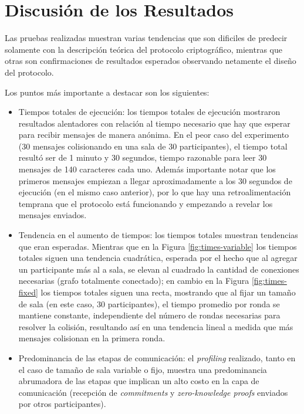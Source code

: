\section{Discusión de los Resultados}

Las pruebas realizadas muestran varias tendencias que son dificiles de 
predecir solamente con la descripción teórica del protocolo criptográfico, 
mientras que otras son confirmaciones de resultados esperados observando 
netamente el diseño del protocolo.

Los puntos más importante a destacar son los siguientes:

\begin{itemize}
	\item Tiempos totales de ejecución: los tiempos totales de ejecución 
	mostraron resultados alentadores con relación al tiempo necesario que hay 
	que esperar para recibir mensajes de manera anónima. En el peor caso del 
	experimento (30 mensajes colisionando en una sala de 30 participantes), el 
	tiempo total resultó ser de 1 minuto y 30 segundos, tiempo razonable para 
	leer 30 mensajes de 140 caracteres cada uno. Además importante notar que 
	los primeros mensajes empiezan a llegar aproximadamente a los 30 segundos 
	de ejecución (en el mismo caso anterior), por lo que hay una 
	retroalimentación temprana que el protocolo está funcionando y empezando a 
	revelar los mensajes enviados.
	\item Tendencia en el aumento de tiempos: los tiempos totales muestran 
	tendencias que eran esperadas. Mientras que en la Figura 
	\ref{fig:times-variable} los tiempos totales siguen una tendencia 
	cuadrática, esperada por el hecho que al agregar un participante más al a 
	sala, se elevan al cuadrado la cantidad de conexiones necesarias (grafo 
	totalmente conectado); en cambio en la Figura \ref{fig:times-fixed} 
	los tiempos totales siguen una recta, mostrando que al fijar un tamaño de 
	sala (en este caso, 30 participantes), el tiempo promedio por ronda se 
	mantiene constante, independiente del número de rondas necesarias para 
	resolver la colisión, resultando así en una tendencia lineal a medida que 
	más mensajes colisionan en la primera ronda.
	\item Predominancia de las etapas de comunicación: el \emph{profiling} 
	realizado, tanto en el caso de tamaño de sala variable o fijo, muestra una 
	predominancia abrumadora de las etapas que implican un alto costo en la 
	capa de comunicación (recepción de \emph{commitments} y 
	\emph{zero-knowledge proofs} enviados por otros participantes). 

\end{itemize}
